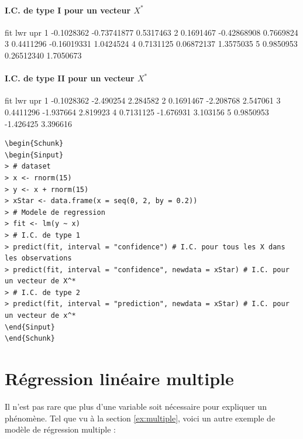 \documentclass[11pt,french]{report}
\begin{document}
\subsubsection*{I.C. de type I pour un vecteur $X^*$}
\begin{Schunk}
\begin{Soutput}
         fit         lwr       upr
1 -0.1028362 -0.73741877 0.5317463
2  0.1691467 -0.42868908 0.7669824
3  0.4411296 -0.16019331 1.0424524
4  0.7131125  0.06872137 1.3575035
5  0.9850953  0.26512340 1.7050673
\end{Soutput}
\end{Schunk}

\subsubsection*{I.C. de type II pour un vecteur $X^*$}
\begin{Schunk}
\begin{Soutput}
         fit       lwr      upr
1 -0.1028362 -2.490254 2.284582
2  0.1691467 -2.208768 2.547061
3  0.4411296 -1.937664 2.819923
4  0.7131125 -1.676931 3.103156
5  0.9850953 -1.426425 3.396616
\end{Soutput}
\end{Schunk}

\begin{lstlisting}[linerange=\\begin\{Sinput\}-\\end\{Sinput\},includerangemarker=false, caption = Code source en R pour l'exemple]
\begin{Schunk}
\begin{Sinput}
> # dataset
> x <- rnorm(15)
> y <- x + rnorm(15)
> xStar <- data.frame(x = seq(0, 2, by = 0.2)) 
> # Modele de regression
> fit <- lm(y ~ x)
> # I.C. de type 1
> predict(fit, interval = "confidence") # I.C. pour tous les X dans les observations
> predict(fit, interval = "confidence", newdata = xStar) # I.C. pour un vecteur de X^*
> # I.C. de type 2
> predict(fit, interval = "prediction", newdata = xStar) # I.C. pour un vecteur de x^*
\end{Sinput}
\end{Schunk}
\end{lstlisting}
\bigskip

\chapter{Régression linéaire multiple}
Il n'est pas rare que plus d'une variable soit nécessaire pour expliquer un phénomène. 
Tel que vu à la section \ref{ex:multiple}, voici un autre exemple de modèle de régression multiple :
\end{document}
